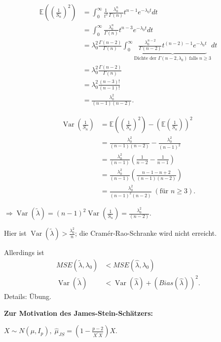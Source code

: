 \documentclass{tstextbook}
\DeclareMathOperator{\Var}{Var}
\newcommand{\E}{\mathbb E}
\begin{document}
\begin{example}
	\[
	\begin{aligned}
		\E\left(\left(\frac{1}{S_n}\right)^2\right) & =  \int_{0}^{\infty} \frac{1}{t^2}\frac{\lambda_0^n}{\Gamma(n)}t^{n-1}e^{-\lambda_0t}dt \\
		& = \int_{0}^{\infty} \frac{\lambda_0^n}{\Gamma(n)}t^{n-3}e^{-\lambda_0t}dt \\
		& = \lambda_0^2 \frac{\Gamma(n-2)}{\Gamma(n)} \int_{0}^{\infty} \underbrace{\frac{\lambda_0^{n-2}}{\Gamma(n-2)}t^{(n-2)-1}e^{-\lambda_0t}}_{\text{Dichte der }\Gamma(n-2,\lambda_0) \text{ falls }n\ge3} dt \\
		& = \lambda_0^2 \frac{\Gamma(n-2)}{\Gamma(n)} \\
		& = \lambda_0^2 \frac{(n-3)!}{(n-1)!} \\
		& = \frac{\lambda_0^2}{(n-1)(n-2)}.
	\end{aligned}
	\]
	
	\[
	\begin{aligned}
		\Var\left(\frac{1}{S_n}\right) & = \E\left(\left(\frac{1}{S_n}\right)^2\right) - \left(\E\left(\frac{1}{S_n}\right)\right)^2 \\
		& = \frac{\lambda_0^2}{(n-1)(n-2)} - \frac{\lambda_0^2}{(n-1)^2} \\
		& = \frac{\lambda_0^2}{(n-1)}\left(\frac{1}{n-2}-\frac{1}{n-1}\right) \\
		& = \frac{\lambda_0^2}{(n-1)}\left(\frac{n-1-n+2}{(n-1)(n-2)}\right) \\
		& = \frac{\lambda_0^2}{(n-1)^2(n-2)} \; (\text{für }n\ge3).
	\end{aligned}
	\]
	
	$ \Rightarrow \Var(\tilde{\lambda}) = (n-1)^2\Var\left(\frac{1}{S_n}\right) = \frac{\lambda_0^2}{(n-2)} $. 
	
	Hier ist $ \Var(\tilde{\lambda}) > \frac{\lambda_0^2}{n} $; die Cramér-Rao-Schranke wird nicht erreicht.
	
	Allerdings ist 
	\[
	\begin{aligned}
		MSE(\tilde{\lambda},\lambda_0) & < MSE(\hat{\lambda},\lambda_0) \\
		\Var(\tilde{\lambda}) & < \Var(\hat{\lambda}) + (Bias(\hat{\lambda}))^2.
	\end{aligned}
	\]
	Details: Übung.
\end{example}

\textbf{Zur Motivation des James-Stein-Schätzers:}

	$ X\sim N(\mu,I_p), \; \hat{\mu}_{JS} = \left(1-\frac{p-2}{X^\prime X}\right)X $. 
	
\end{document}
